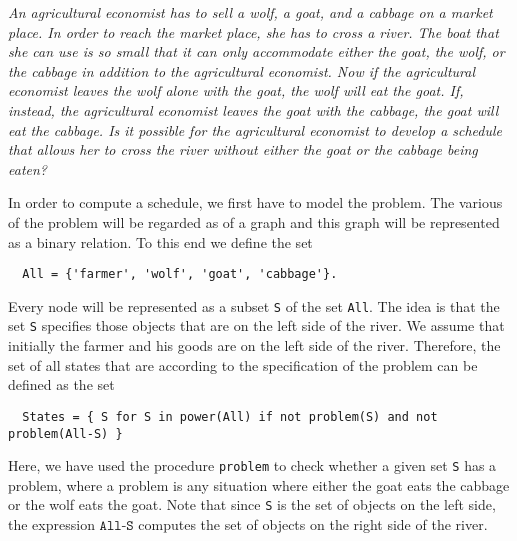 \begin{minipage}[c]{16cm}
{\sl
An agricultural economist has to sell a wolf, a goat, and a cabbage on a market place.  In order to
reach the market place, she has to cross a river.  The boat that she can use is so small that it can
only accommodate either the goat, the wolf, or the cabbage in addition to the agricultural economist.
Now if the agricultural economist leaves the wolf alone with the goat, the wolf will eat the goat.
If, instead, the agricultural economist leaves the goat with the cabbage, the goat will eat the cabbage.
Is it possible for the agricultural economist to develop a schedule that allows her to cross the river
without either the goat or the cabbage being eaten?
}
\end{minipage}
\vspace*{0.3cm}

\noindent
In order to compute a schedule, we first have to model the problem.  The various  of the problem will
be regarded as  of a graph and this graph will be represented as a binary relation.
To this end we define the set
\begin{verbatim}
  All = {'farmer', 'wolf', 'goat', 'cabbage'}.
\end{verbatim}
Every node will be represented as a subset \texttt{S} of the set \texttt{All}.  The idea is that the set \texttt{S}
specifies those objects that are on the left side of the river.  We assume that initially the farmer and his goods
are on the left side of the river. 
Therefore, the set of all states that are  according to the specification of the problem can be defined
as the set 
\begin{verbatim}
  States = { S for S in power(All) if not problem(S) and not problem(All-S) }
\end{verbatim}
Here, we have used the procedure \texttt{problem} to check whether a given set \texttt{S} has a problem,
where a problem is any situation where either the goat eats the cabbage or the wolf eats the goat.
Note that since \texttt{S} is the set of objects on the left side, the expression $\texttt{All-S}$
computes the set of objects on the right side of the river.

